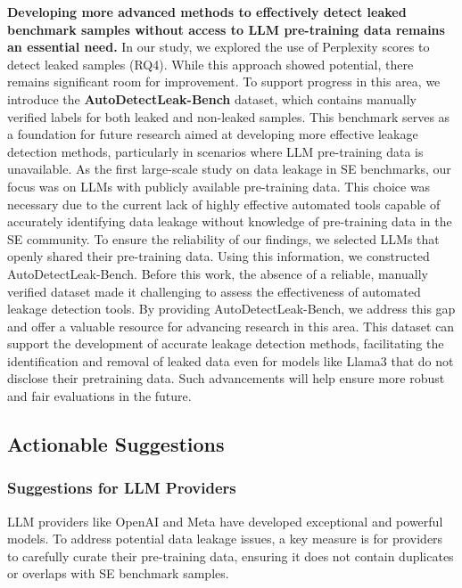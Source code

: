 \vspace{0.1cm}
\noindent
\textbf{Developing more advanced methods to effectively detect leaked benchmark samples without access to LLM pre-training data remains an essential need.} In our study, we explored the use of Perplexity scores to detect leaked samples (RQ4). While this approach showed potential, there remains significant room for improvement. To support progress in this area, we introduce the \textbf{AutoDetectLeak-Bench} dataset, which contains manually verified labels for both leaked and non-leaked samples. This benchmark serves as a foundation for future research aimed at developing more effective leakage detection methods, particularly in scenarios where LLM pre-training data is unavailable.
As the first large-scale study on data leakage in SE benchmarks, our focus was on LLMs with publicly available pre-training data. This choice was necessary due to the current lack of highly effective automated tools capable of accurately identifying data leakage without knowledge of pre-training data in the SE community. To ensure the reliability of our findings, we selected LLMs that openly shared their pre-training data. Using this information, we constructed AutoDetectLeak-Bench.
Before this work, the absence of a reliable, manually verified dataset made it challenging to assess the effectiveness of automated leakage detection tools. By providing AutoDetectLeak-Bench, we address this gap and offer a valuable resource for advancing research in this area. This dataset can support the development of accurate leakage detection methods, facilitating the identification and removal of leaked data even for models like Llama3 that do not disclose their pretraining data. Such advancements will help ensure more robust and fair evaluations in the future.





\subsection{Actionable Suggestions}
\subsubsection{\textbf{Suggestions for LLM Providers}}
LLM providers like OpenAI and Meta have developed exceptional and powerful models. To address potential data leakage issues, a key measure is for providers to carefully curate their pre-training data, ensuring it does not contain duplicates or overlaps with SE benchmark samples. 

